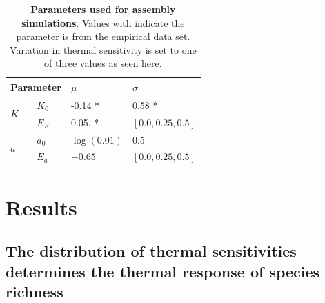 \documentclass{article}
\begin{document}
\begin{table}[h]
    \centering
   \begin{tabular}{llll}
        \hline
        \multicolumn{2}{l}{Parameter} & $\mu$        & $\sigma$          \\ \hline
        \multirow{2}{*}{$K$}  & $K_0$ & -0.14 *      & 0.58 *            \\
                              & $E_K$ & 0.05. *      & $[0.0, 0.25, 0.5]$ \\
        \multirow{2}{*}{$a$}  & $a_0$ & $\log(0.01)$ & $0.5$             \\
                              & $E_a$ & $-0.65$      & $[0.0, 0.25, 0.5]$ \\
        \hline
\end{tabular}
    \caption{\textbf{Parameters used for assembly simulations}. Values with indicate the parameter is from the empirical data set. Variation in thermal sensitivity is set to one of three values as seen here.}
    \label{Tab:SimParams}
\end{table}


\section*{Results}

\subsection*{The distribution of thermal sensitivities determines the thermal response of species richness}
\end{document}
